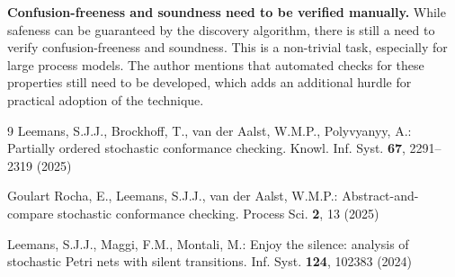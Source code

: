 \documentclass[runningheads]{llncs}
\begin{document}
\noindent\textbf{Confusion-freeness and soundness need to be verified manually.} While safeness can be guaranteed by the discovery algorithm, there is still a need to verify confusion-freeness and soundness. This is a non-trivial task, especially for large process models. The author mentions that automated checks for these properties still need to be developed, which adds an additional hurdle for practical adoption of the technique.



\begin{thebibliography}{9}
Leemans, S.J.J., Brockhoff, T., van der Aalst, W.M.P., Polyvyanyy, A.: Partially ordered stochastic conformance checking. Knowl. Inf. Syst. \textbf{67}, 2291--2319 (2025)

Goulart Rocha, E., Leemans, S.J.J., van der Aalst, W.M.P.: Abstract-and-compare stochastic conformance checking. Process Sci. \textbf{2}, 13 (2025)

Leemans, S.J.J., Maggi, F.M., Montali, M.: Enjoy the silence: analysis of stochastic Petri nets with silent transitions. Inf. Syst. \textbf{124}, 102383 (2024)
\end{thebibliography}
\end{document}
